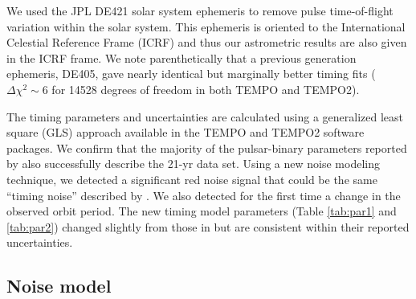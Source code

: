 We used the JPL DE421 solar system ephemeris \citep{fwb09} to remove pulse
time-of-flight variation within the solar system. This ephemeris is oriented
to the International Celestial Reference Frame (ICRF) and thus our astrometric
results are also given in the ICRF frame. We note parenthetically that a
previous generation ephemeris, DE405, gave nearly identical but marginally
better timing fits ($\Delta\chi^2\sim6$ for 14528 degrees of freedom in both
{\sc TEMPO} and {\sc TEMPO2}).

The timing parameters and uncertainties are calculated using a generalized least
square (GLS) approach available in the {\sc TEMPO} and {\sc TEMPO2} software packages. 
We confirm that the majority of the pulsar-binary parameters reported by
\citet{sns+05} also successfully describe the 21-yr data set. Using a new
noise modeling technique, we detected 
a significant red noise signal that could be the same ``timing noise''
described by \citet{sns+05}.
We also detected for the first time a change in the observed orbit period.
The new timing model parameters (Table \ref{tab:par1} and \ref{tab:par2}) changed slightly from
those in \citet{sns+05} but are consistent within their reported uncertainties.




\subsection{Noise model}
\label{sec:noise}

